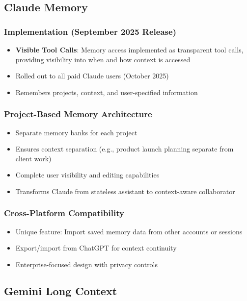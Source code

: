 \documentclass[11pt,letterpaper]{article}
\begin{document}
\subsection{Claude Memory}

\subsubsection{Implementation (September 2025 Release)}
\begin{itemize}[leftmargin=*]
    \item \textbf{Visible Tool Calls}: Memory access implemented as transparent tool calls, providing visibility into when and how context is accessed
    \item Rolled out to all paid Claude users (October 2025)
    \item Remembers projects, context, and user-specified information
\end{itemize}

\subsubsection{Project-Based Memory Architecture}
\begin{itemize}[leftmargin=*]
    \item Separate memory banks for each project
    \item Ensures context separation (e.g., product launch planning separate from client work)
    \item Complete user visibility and editing capabilities
    \item Transforms Claude from stateless assistant to context-aware collaborator
\end{itemize}

\subsubsection{Cross-Platform Compatibility}
\begin{itemize}[leftmargin=*]
    \item Unique feature: Import saved memory data from other accounts or sessions
    \item Export/import from ChatGPT for context continuity
    \item Enterprise-focused design with privacy controls
\end{itemize}

\subsection{Gemini Long Context}
\end{document}
